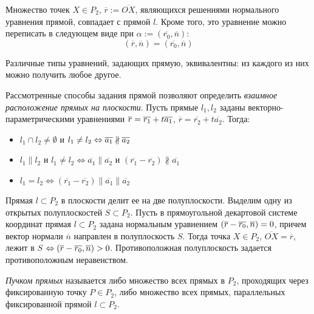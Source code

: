\begin{note}
	Множество точек $X \in P_2$, $\overline{r} := \overline{OX}$, являющихся решениями нормального уравнения прямой, совпадает с прямой $l$. Кроме того, это уравнение можно переписать в следующем виде при $\alpha := (\overline{r_0}, \overline{n})$:
	\[(\overline{r}, \overline{n}) = (\overline{r_0}, \overline{n})\]
\end{note}

\begin{note}
	Различные типы уравнений, задающих прямую, эквивалентны: из каждого из них можно получить любое другое.
\end{note}

\begin{note}
	Рассмотренные способы задания прямой позволяют определить \textit{взаимное расположение прямых на плоскости}. Пусть прямые $l_1, l_2$ заданы векторно-параметричес\-кими уравнениями $\overline{r} \hm{=} \overline{r_1} + t\overline{a_1}$, $\overline{r} = \overline{r_2} + t\overline{a_2}$. Тогда:
	\begin{itemize}
		\item $l_1 \cap l_2 \ne \emptyset$ и $l_1 \ne l_2 \Leftrightarrow \overline{a_1} \nparallel \overline{a_2}$
		\item $l_1 \parallel l_2$ и $l_1 \ne l_2 \Leftrightarrow \overline{a_1} \parallel \overline{a_2}$ и $(\overline{r_1} - \overline{r_2}) \nparallel \overline{a_1}$ 
		\item $l_1 = l_2 \Leftrightarrow (\overline{r_1} - \overline{r_2}) \parallel \overline{a_1} \parallel \overline{a_2}$
	\end{itemize}
\end{note}

\begin{note}
	Прямая $l \subset P_2$ в плоскости делит ее на две полуплоскости. Выделим одну из открытых полуплоскостей $S \subset P_2$. Пусть в прямоугольной декартовой системе координат прямая $l \subset P_2$ задана нормальным уравнением $(\overline{r} \hm{-} \overline{r_0}, \overline{n}) = 0$, причем вектор нормали $\overline{n}$ направлен в полуплоскость $S$. Тогда точка $X \in P_2$, $\overline{OX} = \overline{r}$, лежит в $S$ $\Leftrightarrow (\overline{r} \hm{-} \overline{r_0}, \overline{n}) > 0$. Противоположная полуплоскость задается противоположным неравенством.
\end{note}

\begin{definition}
	\textit{Пучком прямых} называется либо множество всех прямых в $P_2$, проходящих через фиксированную точку $P \in P_2$, либо множество всех прямых, параллельных фиксированной прямой $l \subset P_2$.
\end{definition}

